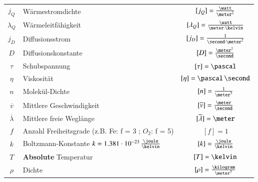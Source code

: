 \medskip

\renewcommand{\arraystretch}{1.5}
\begin{tabular}{c l c}
	$j_Q$ 					& Wärmestromdichte 															& $[j_Q] = \frac{\watt}{\meter^2}$ 			\\
	$\lambda_Q$ 			    & Wärmeleitfähigkeit 														& $[\lambda_Q] = \frac{\watt}{\meter \cdot \kelvin}$	\\
	$j_D$ 					& Diffusionsstrom 															& $[j_D] = \frac{1}{\second \cdot \meter^2}$ 								\\
	$D$ 					& Diffusionskonstante 														& $[D] = \frac{\meter^2}{\second}$ 			\\
	$\tau$ 					& Schubspannung 															& $[\tau] = \pascal$ 						\\
	$\eta$ 					& Viskosität	 															& $[\eta] = \pascal \, \second$ 			\\
	$n$ 					& Molekül-Dichte 															& $[n] = \frac{1}{\meter^3}$				\\	
	$\overline{v}$ 			& Mittlere Geschwindigkeit 													& $[\overline{v}] = \frac{\meter}{\second}$	\\
	$\overline{\lambda}$ 	& Mittlere freie Weglänge 													& $[\overline{\lambda}] = \meter$ 			\\
	$f$ 					& Anzahl Freiheitsgrade (z.B. Fe: f = 3 ; $O_2$: f = 5)													& $[f] = 1$ 								\\
	$k$ 					& Boltzmann-Konstante $k = 1.381 \cdot 10^{-23} \, \frac{\joule}{\kelvin}$	& $[k] = \frac{\joule}{\kelvin}$			\\
	$T$ 					& \textbf{Absolute} Temperatur 												& $[T] = \kelvin$ 							\\
	$\rho$ 					& Dichte 																	& $[\rho] = \frac{\kilogram}{\meter^3}$
\end{tabular}
\renewcommand{\arraystretch}{1}